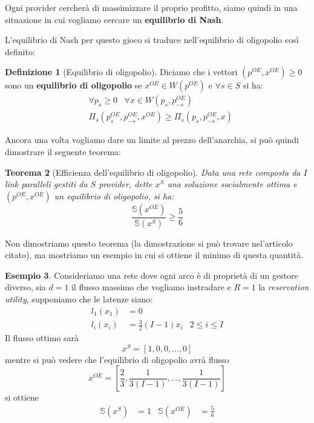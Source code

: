 \documentclass[a4paper]{article}
\theoremstyle{plain}
\newtheorem{myteo}{Teorema}[section]
\theoremstyle{definition}
\newtheorem{mydef}[myteo]{Definizione}
\newtheorem{myes}[myteo]{Esempio}
\theoremstyle{remark}
\newcommand{\pa}[1]{\left(#1\right)}
\newcommand{\bra}[1]{\left[#1\right]}
\begin{document}
Ogni provider cercherà di massimizzare il proprio profitto, siamo
quindi in una situazione in cui vogliamo cercare un \textbf{equilibrio
  di Nash}.

L'equilibrio di Nash per questo gioco si traduce nell'equilibrio di
oligopolio così definito:
\begin{mydef}[Equilibrio di oligopolio]
  Diciamo che i vettori $\pa{p^{OE},x^{OE}}\ge 0$ sono un
  \textbf{equilibrio di oligopolio} se $x^{OE}\in W\pa{p^{OE}}$ e
  $\forall s\in S$ si ha:
  \begin{align*}
    & \forall p_s \ge 0\;\;\; \forall x\in W\pa{p_s,p^{OE}_{-s}} \\
    & \Pi_s \pa{p^{OE}_s, p^{OE}_{-s},x^{OE}} \ge \Pi _s \pa{p_s, p^{OE}_{-s},x}
  \end{align*}
\end{mydef}

Ancora una volta vogliamo dare un limite al prezzo dell'anarchia, si
può quindi dimostrare il seguente teorema:

\begin{myteo}[Efficienza dell'equilibrio di
  oligopolio{\cite[Teorema 5.2]{acemoglu2007-2}}]
  Data una rete composta da $I$ link paralleli gestiti da $S$
  provider, dette $x^{S}$ una soluzione socialmente ottima e
  $\pa{p^{OE},x^{OE}}$ un equilibrio di oligopolio, si ha:
  \[ \frac{\mathbb{S}\pa{x^{OE}}} {\mathbb{S}\pa{x^S}} \ge
    \frac{5}{6} \]
\end{myteo}
Non dimostriamo questo teorema (la dimostrazione si può trovare
nel'articolo citato), ma mostriamo un esempio in cui si ottiene il
minimo di questa quantità.

\begin{myes}
  Consideriamo una rete dove ogni arco è di proprietà di un gestore
  diverso, sia $d=1$ il flusso massimo che vogliamo instradare e $R=1$
  la \textit{reservation utility}, supponiamo che le latenze siano:
  \begin{align*}
    l_1(x_1) &= 0 \\
    l_i(x_i) &= \frac{3}{2}(I-1)x_i & 2 \le i \le I
  \end{align*}
  Il flusso ottimo sarà
  \[ x^S = \bra{1,0,0,\dots, 0} \]
  mentre si può vedere che l'equilibrio di oligopolio avrà flusso
  \[ x^{OE} = \bra{ \frac{2}{3}, \frac{1}{3(I-1)}, \dots ,
      \frac{1}{3(I-1)}} \]
  si ottiene
  \begin{align*}
    \mathbb{S}\pa{x^S} & = 1 & \mathbb{S}\pa{x^{OE}} & = \frac{5}{6}
  \end{align*}
\end{myes}
\end{document}
